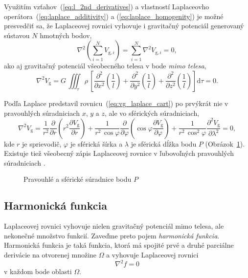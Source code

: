 \documentclass[a4paper, 12pt]{book}
\newcommand{\diff}{\mathrm d}
\newcommand{\gidx}{\mathrm g}
\begin{document}
Využitím vzťahov~(\ref{eq:l_2nd_derivatives}) a vlastností Laplaceovho 
operátora~(\ref{eq:laplace_additivity}) a (\ref{eq:laplace_homogenity}) je 
možné presvedčiť sa, že Laplaceovej rovnici vyhovuje i gravitačný potenciál 
generovaný sústavou $N$ hmotných bodov,
%
\begin{equation}
\nabla^2 \left( \sum_{i = 1}^N V_{\gidx,i} \right) = \sum_{i = 1}^N \nabla^2 
V_{\gidx,i} = 0{,}
\end{equation}
%
ako aj gravitačný potenciál všeobecného telesa v bode \emph{mimo telesa},
%
\begin{equation}
\nabla^2 V_\gidx = G\, \iiint_\tau \rho \, \left[ \frac{\partial^2}{\partial 
x^2}\left(\frac{1}{l}\right) + \frac{\partial^2}{\partial 
y^2}\left(\frac{1}{l}\right) + \frac{\partial^2}{\partial 
z^2}\left(\frac{1}{l}\right) \right] \diff\tau = 0{.}
\end{equation}

Podľa \cite{MacMillan1930} Laplace predstavil 
rovnicu~(\ref{eq:vg_laplace_cart}) po prvýkrát nie v pravouhlých súradniciach 
$x$, $y$ a $z$, ale vo sférických súradniciach,
%
\begin{equation}
\label{eq:vg_laplace_sph}
\nabla^2 V_\gidx = \frac{1}{r^2} \frac{\partial}{\partial r} \left( r^2 
\frac{\partial V_\gidx}{\partial r} \right) + \frac{1}{r^2 \, \cos\varphi} 
\frac{\partial}{\partial \varphi} \left( \cos\varphi \frac{\partial 
V_\gidx}{\partial \varphi} \right) + \frac{1}{r^2 \, 
\cos^2\varphi}\frac{\partial^2 V_\gidx}{\partial \lambda^2} = 0{,}
\end{equation}
%
kde $r$ je sprievodič, $\varphi$ je sférická šírka a $\lambda$ je sférická 
dĺžka bodu $P$ (Obrázok~\ref{fig:cart_sph}).  Existuje tiež všeobecný zápis 
Laplaceovej rovnice v ľubovoľných pravouhlých súradniciach \citep[pozri 
napríklad][]{MoritzPhysicalGeodesy}.

\begin{figure}
\centering

\caption{Pravouhlé a sférické súradnice bodu $P$}
\label{fig:cart_sph}
\end{figure}






\subsection{Harmonická funkcia}

Laplaceovej rovnici vyhovuje nielen gravitačný potenciál mimo telesa, ale 
nekonečné množstvo funkcií.  Zaveďme preto pojem \emph{harmonická funkcia}.  
Harmonická funkcia je taká funkcia, ktorá má spojité prvé a druhé parciálne 
derivácie na otvorenej množine $\Omega$ a vyhovuje Laplaceovej rovnici
%
\begin{equation}
\nabla^2 f = 0
\end{equation}
%
v každom bode oblasti $\Omega$.
\end{document}
